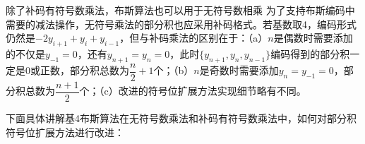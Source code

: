 除了补码有符号数乘法，布斯算法也可以用于无符号数相乘%
为了支持布斯编码中需要的减法操作，无符号乘法的部分积也应采用补码格式。若基数取4，编码形式仍然是$-2 y_{i+1} + y_i + y_{i-1}$，但与补码乘法的区别在于：（a）$n$是偶数时需要添加的不仅是$y_{-1} = 0$，还有$y_{n+1} = y_n = 0$，此时$\{y_{n+1}, y_n, y_{n-1} \}$编码得到的部分积一定是0或正数，部分积总数为$\dfrac{n}{2} + 1$个；（b）$n$是奇数时需要添加$y_n = y_{-1} = 0$，部分积总数为$\dfrac{n+1}{2}$个；（c）改进的符号位扩展方法实现细节略有不同。

下面具体讲解基4布斯算法在无符号数乘法和补码有符号数乘法中，如何对部分积符号位扩展方法进行改进\cite{EM:booth_sign_extension}：


\begin{figure}[!htb]
    \centering
\end{figure}
